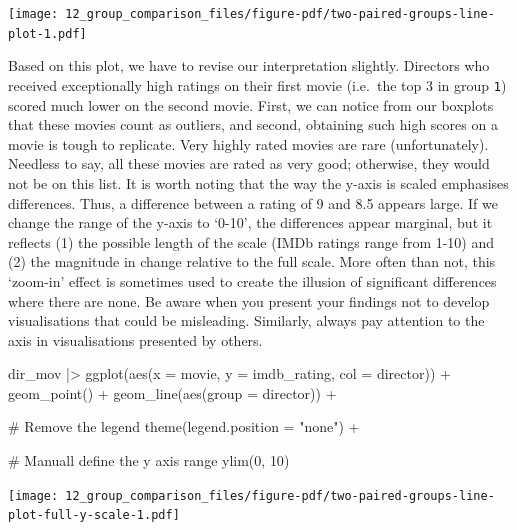 \documentclass[
  letterpaper,
]{krantz}
\makeatletter
\newenvironment{Shaded}{\begin{snugshade}}{\end{snugshade}}
\newcommand{\AttributeTok}[1]{\textcolor[rgb]{0.40,0.45,0.13}{#1}}
\newcommand{\CommentTok}[1]{\textcolor[rgb]{0.37,0.37,0.37}{#1}}
\newcommand{\DecValTok}[1]{\textcolor[rgb]{0.68,0.00,0.00}{#1}}
\newcommand{\FunctionTok}[1]{\textcolor[rgb]{0.28,0.35,0.67}{#1}}
\newcommand{\NormalTok}[1]{\textcolor[rgb]{0.00,0.23,0.31}{#1}}
\newcommand{\SpecialCharTok}[1]{\textcolor[rgb]{0.37,0.37,0.37}{#1}}
\newcommand{\StringTok}[1]{\textcolor[rgb]{0.13,0.47,0.30}{#1}}
\newenvironment{kframe}{%
\medskip{}
\setlength{\fboxsep}{.8em}
 \def\at@end@of@kframe{}%
 \ifinner\ifhmode%
  \def\at@end@of@kframe{\end{minipage}}%
  \begin{minipage}{\columnwidth}%
 \fi\fi%
 \def\FrameCommand##1{\hskip\@totalleftmargin \hskip-\fboxsep
 \colorbox{shadecolor}{##1}\hskip-\fboxsep
     \hskip-\linewidth \hskip-\@totalleftmargin \hskip\columnwidth}%
 \MakeFramed {\advance\hsize-\width
   \@totalleftmargin\z@ \linewidth\hsize
   \@setminipage}}%
 {\par\unskip\endMakeFramed%
 \at@end@of@kframe}
\renewenvironment{Shaded}{\begin{kframe}}{\end{kframe}}
\makeatother
\begin{document}
\texttt{[image: 12\_group\_comparison\_files/figure-pdf/two-paired-groups-line-plot-1.pdf]}

Based on this plot, we have to revise our interpretation slightly.
Directors who received exceptionally high ratings on their first movie
(i.e.~the top 3 in group \texttt{1}) scored much lower on the second
movie. First, we can notice from our boxplots that these movies count as
outliers, and second, obtaining such high scores on a movie is tough to
replicate. Very highly rated movies are rare (unfortunately). Needless
to say, all these movies are rated as very good; otherwise, they would
not be on this list. It is worth noting that the way the y-axis is
scaled emphasises differences. Thus, a difference between a rating of 9
and 8.5 appears large. If we change the range of the y-axis to `0-10',
the differences appear marginal, but it reflects (1) the possible length
of the scale (IMDb ratings range from 1-10) and (2) the magnitude in
change relative to the full scale. More often than not, this `zoom-in'
effect is sometimes used to create the illusion of significant
differences where there are none. Be aware when you present your
findings not to develop visualisations that could be misleading.
Similarly, always pay attention to the axis in visualisations presented
by others.

\begin{Shaded}
\begin{Highlighting}[]
\NormalTok{dir\_mov }\SpecialCharTok{|\textgreater{}}
  \FunctionTok{ggplot}\NormalTok{(}\FunctionTok{aes}\NormalTok{(}\AttributeTok{x =}\NormalTok{ movie, }\AttributeTok{y =}\NormalTok{ imdb\_rating, }\AttributeTok{col =}\NormalTok{ director)) }\SpecialCharTok{+}
  \FunctionTok{geom\_point}\NormalTok{() }\SpecialCharTok{+}
  \FunctionTok{geom\_line}\NormalTok{(}\FunctionTok{aes}\NormalTok{(}\AttributeTok{group =}\NormalTok{ director)) }\SpecialCharTok{+}
  
  \CommentTok{\# Remove the legend}
  \FunctionTok{theme}\NormalTok{(}\AttributeTok{legend.position =} \StringTok{"none"}\NormalTok{) }\SpecialCharTok{+}
  
  \CommentTok{\# Manuall define the y axis range}
  \FunctionTok{ylim}\NormalTok{(}\DecValTok{0}\NormalTok{, }\DecValTok{10}\NormalTok{)}
\end{Highlighting}
\end{Shaded}

\texttt{[image: 12\_group\_comparison\_files/figure-pdf/two-paired-groups-line-plot-full-y-scale-1.pdf]}
\end{document}
